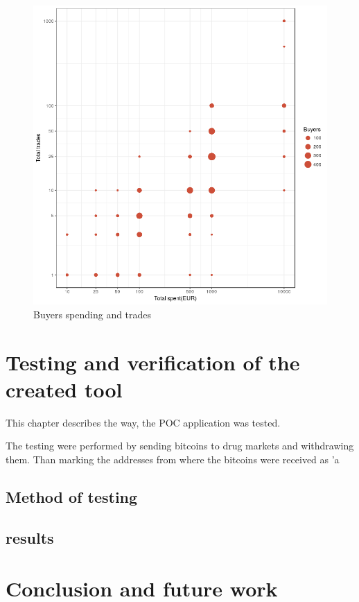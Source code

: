 \documentclass[
  digital, %
  table,   %
  lof,     %
  lot,     %
  oneside
]{fithesis3}
\begin{document}
\begin{figure}[!htb]
    \centering
    \includegraphics[scale=0.4]{buytrad}
    \caption{Buyers spending and trades}
    \label{buytrad}
\end{figure}



\chapter{Testing and verification of the created tool}
This chapter describes the way, the POC application was tested.

The testing were performed by sending bitcoins to drug markets and withdrawing them.
Than marking the addresses from where the bitcoins were received as 'a
\section{Method of testing}
\section{results}



\chapter{Conclusion and future work}
\end{document}
